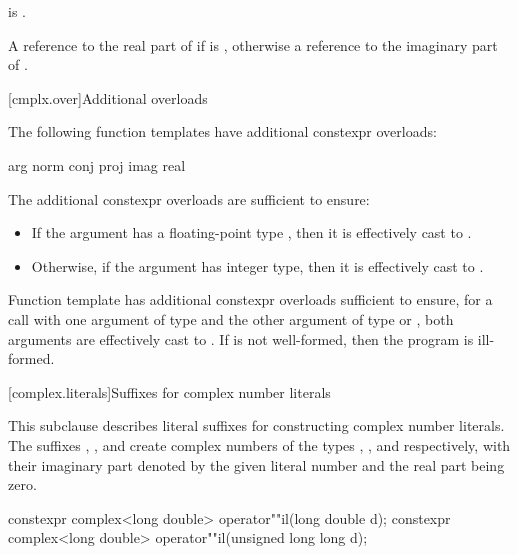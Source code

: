 \begin{itemdescr}
\pnum
\mandates
{} is .

\pnum
\returns
A reference to the real part of  if  is ,
otherwise a reference to the imaginary part of .
\end{itemdescr}

[cmplx.over]{Additional overloads}

\pnum
{}%
%
%
%
%
The following function templates have additional constexpr overloads:
\begin{codeblock}
arg                   norm
conj                  proj
imag                  real
\end{codeblock}

\pnum
{}%
The additional constexpr overloads are sufficient to ensure:
\begin{itemize}
\item
If the argument has a floating-point type ,
then it is effectively cast to .
\item
Otherwise, if the argument has integer type,
then it is effectively cast to .
\end{itemize}

\pnum
{}%
Function template  has additional constexpr overloads sufficient to ensure,
for a call with one argument of type  and
the other argument of type  or ,
both arguments are effectively cast to .
If  is not well-formed,
then the program is ill-formed.

[complex.literals]{Suffixes for complex number literals}

%
\pnum
This subclause describes literal suffixes for constructing complex number literals.
The suffixes , , and  create complex numbers of
the types , , and
 respectively, with their imaginary part denoted by the
given literal number and the real part being zero.

%
\begin{itemdecl}
constexpr complex<long double> operator""il(long double d);
constexpr complex<long double> operator""il(unsigned long long d);
\end{itemdecl}

